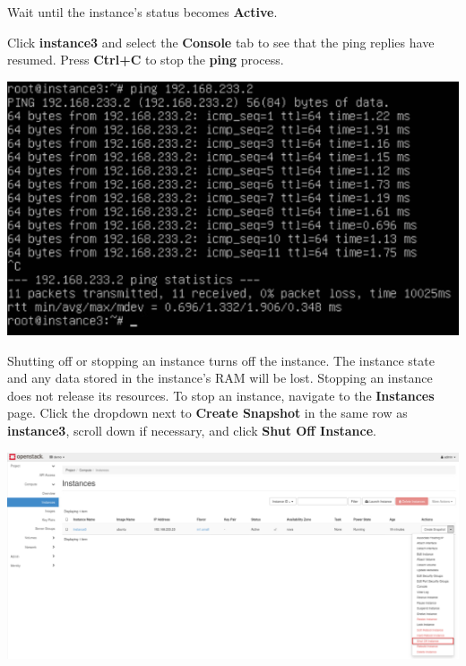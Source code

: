 \documentclass[letterpaper, 12pt]{article}
\begin{document}
\begin{enumerate}
    \begin{stopbox}
        Wait until the instance's status becomes \textbf{Active}.
    \end{stopbox}

    \begin{labstep}
        Click \textbf{instance3} and select the \textbf{Console} tab to see that the ping replies have resumed.
        Press \textbf{Ctrl+C} to stop the \textbf{ping} process.

        \begin{center}
            \includegraphics[width=\linewidth]{images/part3/step16.png}
        \end{center}
    \end{labstep}

    \begin{labstep}
        Shutting off or stopping an instance turns off the instance.
        The instance state and any data stored in the instance's RAM will be lost.
        Stopping an instance does not release its resources.
        To stop an instance, navigate to the \textbf{Instances} page.
        Click the dropdown next to \textbf{Create Snapshot} in the same row as \textbf{instance3}, scroll down if necessary, and click \textbf{Shut Off Instance}.

        \begin{center}
            \includegraphics[width=\linewidth]{images/part3/step17.png}
        \end{center}
    \end{labstep}


\end{enumerate}
\end{document}
